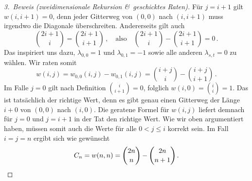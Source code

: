 \begin{proof}[3.\ Beweis \textmd{(zweidimensionale Rekursion \&\ geschicktes Raten)}]
	Für $j=i+1$ gilt $w(i,i+1)=0$, denn jeder Gitterweg von $(0,0)$ nach $(i,i+1)$ muss irgendwo die Diagonale überschreiten. Andererseits gilt auch
	\begin{equation*}
		\binom{2i+1}{i}=\binom{2i+1}{i+1}\,,\quad\text{also}\quad\binom{2i+1}{i}-\binom{2i+1}{i+1}=0\,.
	\end{equation*}
	Das inspiriert uns dazu, $\lambda_{0,0}=1$ und $\lambda_{0,1}=-1$ sowie alle anderen $\lambda_{s,t}=0$ zu wählen. Wir raten somit 
	\begin{equation*}
		w(i,j)=w_{0,0}(i,j)-w_{0,1}(i,j)=\binom{i+j}{i}-\binom{i+j}{i+1}\,.
	\end{equation*}
	Im Falle $j=0$ gilt nach Definition $\binom{i}{i+1}=0$, folglich $w(i,0)=\binom{i}{i}=1$. Das ist tatsächlich der richtige Wert, denn es gibt genau einen Gitterweg der Länge $i+0$ von $(0,0)$ nach $(i,0)$. Die geratene Formel für $w(i,j)$ liefert demnach für $j=0$ und $j=i+1$ in der Tat den richtige Wert. Wie wir oben argumentiert haben, müssen somit auch die Werte für alle $0<j\leqslant i$ korrekt sein. Im Fall $i=j=n$ ergibt sich wie gewünscht
	\begin{equation*}
		C_n=w(n,n)=\binom{2n}{n}-\binom{2n}{n+1}\,.\qedhere
	\end{equation*}
\end{proof}
